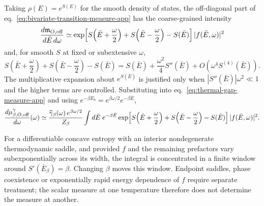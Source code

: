 \documentclass[a4paper,11pt]{article}
\def\dd{d}%
\def\ee{e}%
\theoremstyle{definition}
\theoremstyle{remark}
\newcommand{\dd}{\mathrm d}
\newcommand{\ee}{\mathrm e}
\begin{document}
Taking $\rho(E)=\ee^{S(E)}$ for the smooth density of states, the off-diagonal part of
eq.~\eqref{eq:bivariate-transition-measure-app} has the coarse-grained intensity
\begin{equation}
   \frac{\dd\mathfrak m_{O,{\rm off}}}{\dd\bar E\,\dd\omega}
   \simeq
   \exp\!\left[
      S\!\left(\bar E+\frac{\omega}{2}\right)
     +S\!\left(\bar E-\frac{\omega}{2}\right)-S(\bar E)
   \right]|f(\bar E,\omega)|^2
   \label{eq:bivariate-eth-envelope}
\end{equation}
and, for smooth $S$ at fixed or subextensive $\omega$,
\begin{equation}
   S\!\left(\bar E+\frac{\omega}{2}\right)
  +S\!\left(\bar E-\frac{\omega}{2}\right)-S(\bar E)
   =S(\bar E)+\frac{\omega^2}{4}S''(\bar E)
    +O\!\left(\omega^4S^{(4)}(\bar E)\right).
   \label{eq:eth-entropy-expansion-app}
\end{equation}
The multiplicative expansion about $\ee^{S(\bar E)}$ is justified only when
$|S''(\bar E)|\omega^2\ll1$ and the higher terms are controlled.
Substituting into
eq.~\eqref{eq:thermal-gap-measure-app} and using
$\ee^{-\beta E_b}=\ee^{\beta\omega/2}\ee^{-\beta\bar E}$,
\begin{equation}
   \frac{\dd\mu^\gamma_{\beta,O,{\rm off}}}{\dd\omega}(\omega)
   \simeq\frac{\widehat\gamma_\beta(\omega)\,\ee^{\beta\omega/2}}{Z_\beta}
    \int\dd\bar E\;\ee^{-\beta\bar E}
    \exp\!\left[
      S\!\left(\bar E+\frac{\omega}{2}\right)
     +S\!\left(\bar E-\frac{\omega}{2}\right)-S(\bar E)
    \right]|f(\bar E,\omega)|^2.
   \label{eq:thermal-gap-eth}
\end{equation}

For a differentiable concave entropy with an interior nondegenerate thermodynamic saddle,
and provided $f$ and the remaining prefactors vary subexponentially across its width, the integral
is concentrated in a finite window around $S'(\bar E_\beta)=\beta$.  Changing $\beta$ moves this
window.  Endpoint saddles, phase coexistence or exponentially rapid energy dependence of $f$
require separate treatment; the scalar measure at one temperature therefore does not determine
the measure at another.
\end{document}
